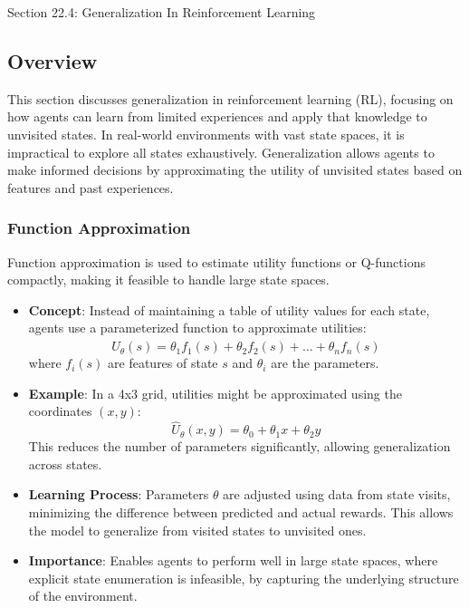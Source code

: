 \begin{notes}{Section 22.4: Generalization In Reinforcement Learning}
    \subsection*{Overview}

    This section discusses generalization in reinforcement learning (RL), focusing on how agents can learn from limited experiences and apply that knowledge to unvisited states. In real-world environments 
    with vast state spaces, it is impractical to explore all states exhaustively. Generalization allows agents to make informed decisions by approximating the utility of unvisited states based on features 
    and past experiences.
    
    \subsubsection*{Function Approximation}
    
    Function approximation is used to estimate utility functions or Q-functions compactly, making it feasible to handle large state spaces.
    
    \begin{highlight}
    
        \begin{itemize}
            \item \textbf{Concept}: Instead of maintaining a table of utility values for each state, agents use a parameterized function to approximate utilities:
            \[
            \hat{U}_\theta(s) = \theta_1 f_1(s) + \theta_2 f_2(s) + \ldots + \theta_n f_n(s)
            \]
            where $f_i(s)$ are features of state $s$ and $\theta_i$ are the parameters.
            \item \textbf{Example}: In a 4x3 grid, utilities might be approximated using the coordinates $(x, y)$:
            \[
            \hat{U}_\theta(x, y) = \theta_0 + \theta_1 x + \theta_2 y
            \]
            This reduces the number of parameters significantly, allowing generalization across states.
            \item \textbf{Learning Process}: Parameters $\theta$ are adjusted using data from state visits, minimizing the difference between predicted and actual rewards. This allows the model to generalize 
            from visited states to unvisited ones.
            \item \textbf{Importance}: Enables agents to perform well in large state spaces, where explicit state enumeration is infeasible, by capturing the underlying structure of the environment.
        \end{itemize}
    

\end{highlight}
\end{notes}
